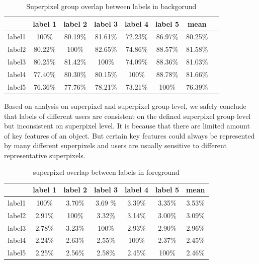 \documentclass[runningheads,a4paper]{llncs}
\begin{document}
\begin{table}[!tb]
\centering
\begin{tabular}{|c|c|c|c|c|c|c|c|}
\hline
 & label 1 & label 2&label 3&label 4&label 5&mean\\
\hline
label1& 100\% &80.19\% & 81.61\%& 72.23\%& 86.97\%&80.25\%\\
\hline
label2& 80.22\% & 100\% & 82.65\%& 74.86\%& 88.57\%&81.58\% \\
\hline
label3& 80.25\% & 81.42\% & 100\%& 74.09\%& 88.36\%&81.03\%\\
\hline
label4& 77.40\% & 80.30\% & 80.15\%& 100\%& 88.78\%&81.66\% \\
\hline
label5& 76.36\% & 77.76\% & 78.21\%& 73.21\%& 100\%&76.39\%\\
\hline
\end{tabular}
\captionsetup{justification=centerlast}
\caption{Superpixel group overlap between labels in backgorund}
\label{ta:group overlap b}
\end{table}

Based on analysis on superpixel and superpixel group level, we safely conclude that labels of different users are consistent on the defined superpixel group level but inconsistent on superpixel level. It is because that there are limited amount of key features of an object. But certain key features could always be represented by many different superpixels and users are usually sensitive to different representative superpixels. 
\begin{table}[!tb]
\centering
\begin{tabular}{|c|c|c|c|c|c|c|}
\hline
 & label 1 & label 2&label 3&label 4&label 5&mean\\
\hline
label1& 100\% & 3.70\% & 3.69	\%& 3.39\%& 3.35\%& 3.53\%\\
\hline
label2& 2.91\% & 100\% & 3.32\%& 3.14\%& 3.00\% & 3.09\%\\
\hline
label3& 2.78\% & 3.23\% & 100\%& 2.93\%& 2.90\%& 2.96\% \\
\hline
label4& 2.24\% & 2.63\% & 2.55\%& 100\%& 2.37\%& 2.45\%\\
\hline
label5& 2.25\% & 2.56\% & 2.58\%& 2.45\%& 100\%& 2.46\% \\
\hline
\end{tabular}
\captionsetup{justification=centerlast}
\caption{superpixel overlap between labels in foreground}
\label{ta: sp overlap f}
\end{table}
\end{document}
